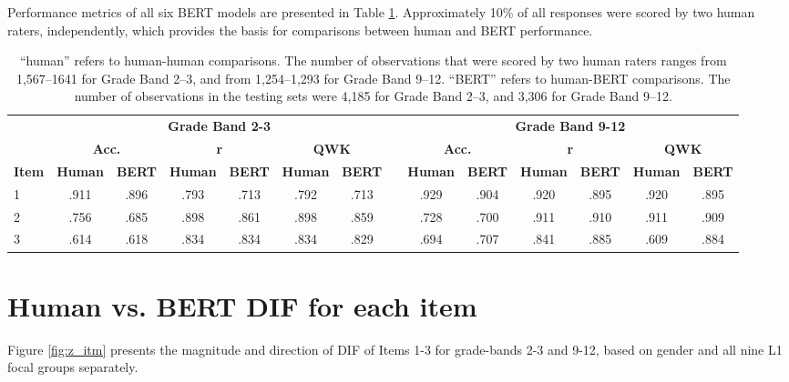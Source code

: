 \documentclass [PhD] {uclathes}
\begin{document}
Performance metrics of all six BERT models are presented in Table \ref{bert_perf}. Approximately 10\% of all responses were scored by two human raters, independently, which provides the basis for comparisons between human and BERT performance. 

\begin{table}[ht]
\centering
\small  %
\begin{tabular}{lccccccccccccc}
\toprule
    & \multicolumn{6}{c}{\textbf{Grade Band 2-3}} & \multicolumn{1}{c}{ } & \multicolumn{6}{c}{\textbf{Grade Band 9-12}} \\
    \cline{2-7}
    \cline{9-14}
    & \multicolumn{2}{c}{\textbf{Acc.}} & \multicolumn{2}{c}{\textbf{r}} & \multicolumn{2}{c}{\textbf{QWK}} & \multicolumn{1}{c}{ } & \multicolumn{2}{c}{\textbf{Acc.}} & \multicolumn{2}{c}{\textbf{r}} & \multicolumn{2}{c}{\textbf{QWK}} \\
    \textbf{Item} & \textbf{Human} & \textbf{BERT} & \textbf{Human} & \textbf{BERT} & \textbf{Human} & \textbf{BERT} & & \textbf{Human} & \textbf{BERT} & \textbf{Human} & \textbf{BERT} & \textbf{Human} & \textbf{BERT} \\
    \midrule
    1 & .911 & .896 & .793 & .713 & .792 & .713 & & .929 & .904 & .920 & .895 & .920 & .895 \\
    2 & .756 & .685 & .898 & .861 & .898 & .859 & & .728 & .700 & .911 & .910 & .911 & .909 \\
    3 & .614 & .618 & .834 & .834 & .834 & .829 & & .694 & .707 & .841 & .885 & .609 & .884 \\
    \bottomrule
    \end{tabular}
\caption{\label{bert_perf}
 “human” refers to human-human comparisons. The number of observations that were scored by two human raters ranges from 1,567–1641 for Grade Band 2–3, and from 1,254–1,293 for Grade Band 9–12. “BERT” refers to human-BERT comparisons. The number of observations in the testing sets were 4,185 for Grade Band 2–3, and 3,306 for Grade Band 9–12.}
\end{table}

\section{Human vs. BERT DIF for each item}
\label{sec:appendix_z_itm}

Figure \ref{fig:z_itm} presents the magnitude and direction of DIF of Items 1-3 for grade-bands 2-3 and 9-12, based on gender and all nine L1 focal groups separately.
\end{document}

